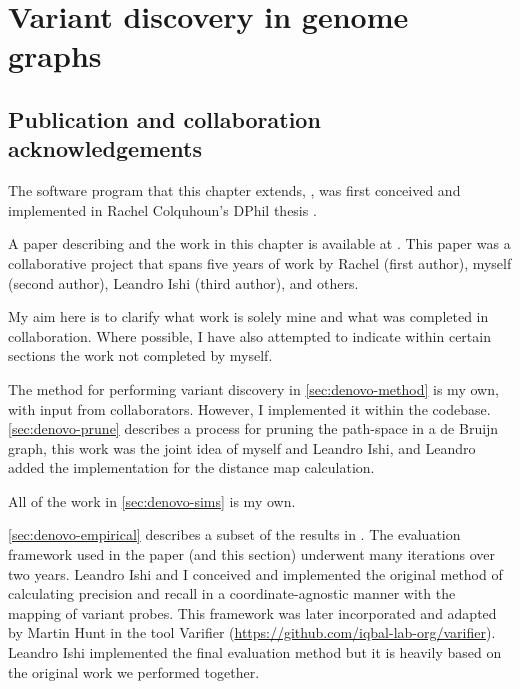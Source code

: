
\chapter{Variant discovery in genome graphs}
\label{chap:denovo}
\ifpdf
    \graphicspath{{Chapter1/Figs/Raster/}{Chapter1/Figs/PDF/}{Chapter1/Figs/}}
\else
    \graphicspath{{Chapter1/Figs/Vector/}{Chapter1/Figs/}}
\fi
\setcounter{section}{-1}
\section{Publication and collaboration acknowledgements}
\label{sec:denovo-acknowledge}

The software program that this chapter extends, \pandora{}, was first conceived and implemented in Rachel Colquhoun's DPhil thesis \cite{rachelthesis}.

A paper describing \pandora{} and the work in this chapter is available at \cite{pandora}. This paper was a collaborative project that spans five years of work by Rachel (first author), myself (second author), Leandro Ishi (third author), and others.

My aim here is to clarify what work is solely mine and what was completed in collaboration. Where possible, I have also attempted to indicate within certain sections the work not completed by myself.

The method for performing \denovo{} variant discovery in \autoref{sec:denovo-method} is my own, with input from collaborators. However, I implemented it within the \pandora{} codebase. \autoref{sec:denovo-prune} describes a process for pruning the path-space in a de Bruijn graph, this work was the joint idea of myself and Leandro Ishi, and Leandro added the implementation for the distance map calculation.

All of the work in \autoref{sec:denovo-sims} is my own.

\autoref{sec:denovo-empirical} describes a subset of the results in \cite{pandora}. The evaluation framework used in the paper (and this section) underwent many iterations over two years. Leandro Ishi and I conceived and implemented the original method of calculating precision and recall in a coordinate-agnostic manner with the mapping of variant probes. This framework was later incorporated and adapted by Martin Hunt in the tool Varifier (\url{https://github.com/iqbal-lab-org/varifier}). Leandro Ishi implemented the final evaluation method but it is heavily based on the original work we performed together.

